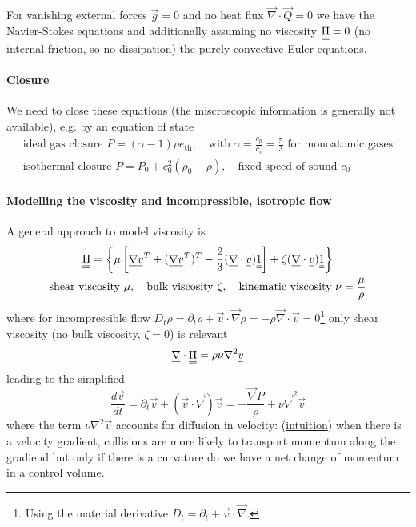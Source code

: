 For vanishing external forces $\vec{g} = 0$ and no heat flux $\vec{\nabla} \cdot \vec{Q} = 0$ we
have the \textcolor{blue1}{Navier-Stokes equations} and additionally assuming no viscosity $\mat{\Pi} = 0$ (no internal friction, so no dissipation) the purely
convective \textcolor{blue1}{Euler equations}.
\paragraph*{Closure} We need to close these equations (the miscroscopic information is generally not available), e.g. by an equation of state
\begin{equation}
    \begin{gathered}
        \text{ideal gas closure } P = (\gamma - 1) \rho e_{\text{th}}, \quad \text{with } \gamma = \frac{c_p}{c_v} = \frac{5}{3} \text{ for monoatomic gases} \\
        \text{isothermal closure } P = P_0 + c_0^2 (\rho_0 - \rho), \quad \text{fixed speed of sound } c_0
    \end{gathered}
\end{equation}
\paragraph*{Modelling the viscosity and incompressible, isotropic flow} A general approach to model viscosity is
\begin{equation}
    \begin{gathered}
        \mat{\Pi} = \left\{ \mu \left[ \vec{\nabla} \vec{v}^T + (\vec{\nabla} \vec{v}^T)^T - \frac{2}{3} (\vec{\nabla}\cdot \vec{v}) \mat{1} \right] + \zeta (\vec{\nabla}\cdot \vec{v}) \mat{1} \right\} \\
        \text{shear viscosity } \mu, \quad \text{bulk viscosity } \zeta, \quad \text{kinematic viscosity } \nu = \frac{\mu}{\rho}
    \end{gathered}
\end{equation}
where for incompressible flow $D_t \rho = \partial_t \rho + \vec{v} \cdot \vec{\nabla} \rho = -\rho \vec{\nabla} \cdot \vec{v} = 0$\footnote{Using
the material derivative $D_t = \partial_t + \vec{v}\cdot \vec{\nabla}$.} only shear viscosity (no bulk viscosity, $\zeta = 0$) is relevant
\begin{equation}
    \vec{\nabla} \cdot \mat{\Pi} = \rho \nu \nabla^2 \vec{v}
\end{equation}
leading to the simplified
\begin{equation}
    \frac{d\vec{v}}{dt} = \partial_t \vec{v} + (\vec{v} \cdot \vec{\nabla}) \vec{v} = -\frac{\vec{\nabla}P}{\rho} + \nu \vec{\nabla}^2 \vec{v}
\end{equation}
where the term $\nu \nabla^2 \vec{v}$ accounts for diffusion in velocity: (\underline{intuition}) when there is a velocity gradient,
collisions are more likely to transport momentum along the gradiend but only if there is a curvature
do we have a net change of momentum in a control volume.

